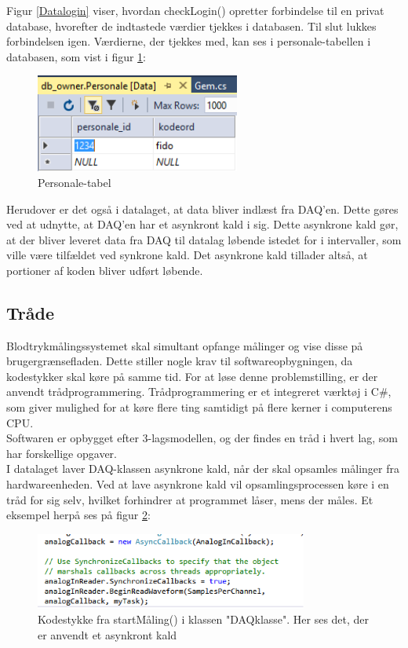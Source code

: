 Figur \ref{Datalogin} viser, hvordan checkLogin() opretter forbindelse til en privat database, hvorefter de indtastede værdier tjekkes i databasen. Til slut lukkes forbindelsen igen. Værdierne, der tjekkes med, kan ses i personale-tabellen i databasen, som vist i figur \ref{personaletabel}:

\begin{figure}[H]
	\centering
	\includegraphics[width=0.6\textwidth]{Figurer/SoftwareImplementering/database}
	\caption{Personale-tabel}
	\label{personaletabel}
\end{figure}

Herudover er det også i datalaget, at data bliver indlæst fra DAQ'en. Dette gøres ved at udnytte, at DAQ'en har et asynkront kald i sig. Dette asynkrone kald gør, at der bliver leveret data fra DAQ til datalag løbende istedet for i intervaller, som ville være tilfældet ved synkrone kald. Det asynkrone kald tillader altså, at portioner af koden bliver udført løbende. 

\subsection{Tråde}
Blodtrykmålingssystemet skal simultant opfange målinger og vise disse på brugergrænsefladen. Dette stiller nogle krav til softwareopbygningen, da kodestykker skal køre på samme tid. For at løse denne problemstilling, er der anvendt trådprogrammering. Trådprogrammering er et integreret værktøj i C\#, som giver mulighed for at køre flere ting samtidigt på flere kerner i computerens CPU.\\
Softwaren er opbygget efter 3-lagsmodellen, og der findes en tråd i hvert lag, som har forskellige opgaver. \\
I datalaget laver DAQ-klassen asynkrone kald, når der skal opsamles målinger fra hardwareenheden. Ved at lave asynkrone kald vil opsamlingsprocessen køre i en tråd for sig selv, hvilket forhindrer at programmet låser, mens der måles. Et eksempel herpå ses på figur \ref{Traad}:

\begin{figure}[H]
	\centering
	\includegraphics[width=0.8\textwidth]{Figurer/SoftwareImplementering/Traad}
	\caption{Kodestykke fra startMåling() i klassen "DAQklasse". Her ses det, der er anvendt et asynkront kald}
	\label{Traad}
\end{figure}

